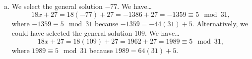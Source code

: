 \documentclass[11pt,letterpaper]{article}
\begin{document}
\begin{enumerate}[(a)]
\item We select the general solution $-77$. We have\dots
	\[
	18x + 27= 18(-77) + 27= -1386 + 27= -1359 \equiv 5 \mod 31,
	\]
where $-1359 \equiv 5 \mod 31$ because $-1359= -44(31) + 5$. Alternatively, we could have selected the general solution $109$. We have\dots
	\[
	18x + 27= 18(109) + 27= 1962 + 27= 1989 \equiv 5 \mod 31,
	\]
where $1989 \equiv 5 \mod 31$ because $1989= 64(31) + 5$.
\end{enumerate}
\end{document}
